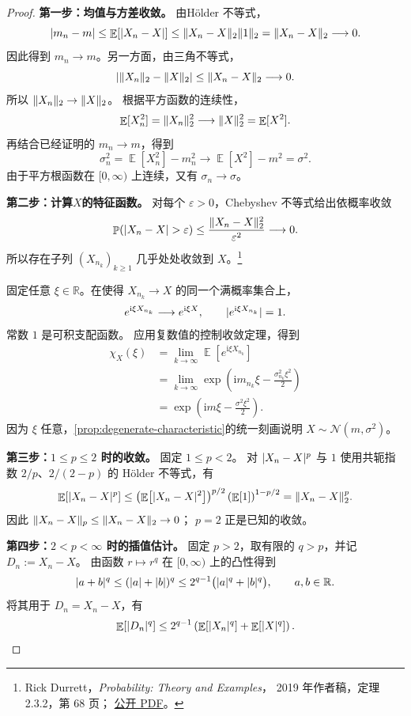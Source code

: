 \documentclass[UTF8,11pt,a4paper,oneside,fontset=fandol]{ctexrep}
\numberwithin{equation}{section}
\theoremstyle{plain}
\theoremstyle{definition}
\theoremstyle{remark}
\newcommand{\R}{\mathbb{R}}
\DeclareMathOperator{\Prob}{\mathbb{P}}
\DeclareMathOperator{\E}{\mathbb{E}}
\DeclarePairedDelimiter{\abs}{\lvert}{\rvert}
\DeclarePairedDelimiter{\norm}{\lVert}{\rVert}
\begin{document}
\begin{proof}
\textbf{第一步：均值与方差收敛。}
由Hölder 不等式，
\[
  \abs{m_n-m}
  \le\E\!\left[\abs{X_n-X}\right]
  \le\norm{X_n-X}_2\norm{1}_2
  =\norm{X_n-X}_2
  \longrightarrow0.
\]
因此得到 $m_n\rightarrow m$。另一方面，由三角不等式，
\[
  \abs*{\norm{X_n}_2-\norm{X}_2}
  \le\norm{X_n-X}_2\longrightarrow0.
\]
所以 $\norm{X_n}_2\to\norm{X}_2$。
根据平方函数的连续性，
\[
  \E[X_n^2]=\norm{X_n}_2^2
  \longrightarrow\norm{X}_2^2=\E[X^2].
\]
再结合已经证明的 $m_n\to m$，得到
\[
  \sigma_n^2=\E[X_n^2]-m_n^2
  \longrightarrow \E[X^2]-m^2
  =\sigma^2.
\]
由于平方根函数在 $[0,\infty)$ 上连续，又有 $\sigma_n\to\sigma$。

\textbf{第二步：计算$X$的特征函数。}
对每个 $\varepsilon>0$，Chebyshev 不等式给出依概率收敛
\[
  \Prob(\abs{X_n-X}>\varepsilon)
  \le\frac{\norm{X_n-X}_2^2}{\varepsilon^2}
  \longrightarrow0.
\]
所以存在子列 $(X_{n_k})_{k\ge1}$ 几乎处处收敛到 $X$。\footnote{%
Rick Durrett，\emph{Probability: Theory and Examples}，
2019 年作者稿，定理 2.3.2，第 68 页；
\href{https://sites.math.duke.edu/~rtd/PTE/PTE5_011119.pdf}{公开 PDF}。}

固定任意 $\xi\in\R$。在使得 $X_{n_k}\to X$ 的同一个满概率集合上，
\[
  e^{\mathrm{i}\xi X_{n_k}}\longrightarrow e^{\mathrm{i}\xi X},
  \qquad \abs{e^{\mathrm{i}\xi X_{n_k}}}=1.
\]
常数 $1$ 是可积支配函数。
应用复数值的控制收敛定理，得到
\begin{align*}
  \chi_X(\xi)
  &=\lim_{k\to\infty}\E\!\left[e^{\mathrm{i}\xi X_{n_k}}\right]\\
  &=\lim_{k\to\infty}
      \exp\!\left(
        \mathrm{i}m_{n_k}\xi-\frac{\sigma_{n_k}^2\xi^2}{2}
      \right)\\
  &=\exp\!\left(\mathrm{i}m\xi-\frac{\sigma^2\xi^2}{2}\right).
\end{align*}
因为 $\xi$ 任意，\cref{prop:degenerate-characteristic}的统一刻画说明
$X\sim\mathcal{N}(m,\sigma^2)$。

\textbf{第三步：$1\le p\le2$ 时的收敛。}
固定 $1\le p<2$。
对 $\abs{X_n-X}^p$ 与 $1$ 使用共轭指数 $2/p$、$2/(2-p)$
的 Hölder 不等式，有
\[
  \E\!\left[\abs{X_n-X}^p\right]
  \le
  \left(\E\!\left[\abs{X_n-X}^2\right]\right)^{p/2}
  \left(\E[1]\right)^{1-p/2}
  =\norm{X_n-X}_2^p.
\]
因此 $\norm{X_n-X}_p\le\norm{X_n-X}_2\to0$；
$p=2$ 正是已知的收敛。

\textbf{第四步：$2<p<\infty$ 时的插值估计。}
固定 $p>2$，取有限的 $q>p$，并记 $D_n:=X_n-X$。
由函数 $r\mapsto r^q$ 在 $[0,\infty)$ 上的凸性得到
\[
  \abs{a+b}^q
  \le(\abs{a}+\abs{b})^q
  \le2^{q-1}\bigl(\abs{a}^q+\abs{b}^q\bigr),
  \qquad a,b\in\R.
\]
将其用于 $D_n=X_n-X$，有
\[
  \E\!\left[\abs{D_n}^q\right]
  \le2^{q-1}\left(
    \E\!\left[\abs{X_n}^q\right]
    +\E\!\left[\abs{X}^q\right]
  \right).
\]


\end{proof}
\end{document}
